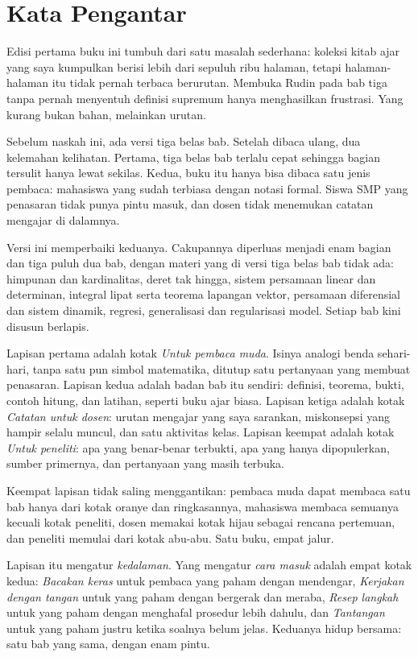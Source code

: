 \chapter*{Kata Pengantar}

Edisi pertama buku ini tumbuh dari satu masalah sederhana: koleksi kitab ajar yang
saya kumpulkan berisi lebih dari sepuluh ribu halaman, tetapi halaman-halaman itu
tidak pernah terbaca berurutan. Membuka Rudin pada bab tiga tanpa pernah menyentuh
definisi supremum hanya menghasilkan frustrasi. Yang kurang bukan bahan, melainkan
urutan.

Sebelum naskah ini, ada versi tiga belas bab. Setelah dibaca ulang, dua kelemahan
kelihatan. Pertama, tiga belas bab terlalu cepat sehingga bagian tersulit hanya lewat
sekilas. Kedua, buku itu hanya bisa dibaca satu jenis pembaca: mahasiswa yang sudah
terbiasa dengan notasi formal. Siswa SMP yang penasaran tidak punya pintu masuk, dan
dosen tidak menemukan catatan mengajar di dalamnya.

Versi ini memperbaiki keduanya. Cakupannya diperluas menjadi enam bagian dan tiga puluh
dua bab, dengan materi yang di versi tiga belas bab tidak ada: himpunan dan
kardinalitas, deret tak hingga, sistem persamaan linear dan determinan, integral lipat
serta teorema lapangan vektor, persamaan diferensial dan sistem dinamik, regresi,
generalisasi dan regularisasi model. Setiap bab kini disusun berlapis.

Lapisan pertama adalah kotak \emph{Untuk pembaca muda}. Isinya analogi benda
sehari-hari, tanpa satu pun simbol matematika, ditutup satu pertanyaan yang membuat
penasaran. Lapisan kedua adalah badan bab itu sendiri: definisi, teorema, bukti,
contoh hitung, dan latihan, seperti buku ajar biasa. Lapisan ketiga adalah kotak
\emph{Catatan untuk dosen}: urutan mengajar yang saya sarankan, miskonsepsi yang
hampir selalu muncul, dan satu aktivitas kelas. Lapisan keempat adalah kotak
\emph{Untuk peneliti}: apa yang benar-benar terbukti, apa yang hanya dipopulerkan,
sumber primernya, dan pertanyaan yang masih terbuka.

Keempat lapisan tidak saling menggantikan: pembaca muda dapat membaca satu bab hanya
dari kotak oranye dan ringkasannya, mahasiswa membaca semuanya kecuali kotak peneliti,
dosen memakai kotak hijau sebagai rencana pertemuan, dan peneliti memulai dari kotak
abu-abu. Satu buku, empat jalur.

Lapisan itu mengatur \emph{kedalaman}. Yang mengatur \emph{cara masuk} adalah empat
kotak kedua: \emph{Bacakan keras} untuk pembaca yang paham dengan mendengar,
\emph{Kerjakan dengan tangan} untuk yang paham dengan bergerak dan meraba,
\emph{Resep langkah} untuk yang paham dengan menghafal prosedur lebih dahulu, dan
\emph{Tantangan} untuk yang paham justru ketika soalnya belum jelas. Keduanya hidup
bersama: satu bab yang sama, dengan enam pintu.

